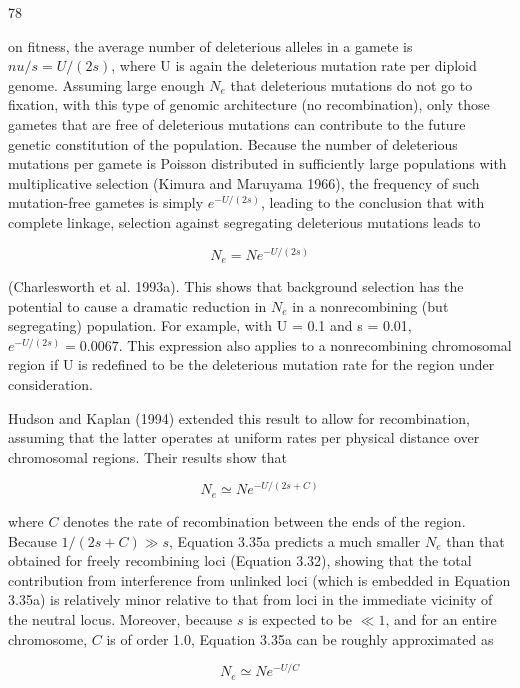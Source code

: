 \documentclass{article}
\begin{document}
78

on fitness, the average number of deleterious alleles in a gamete is  $ nu/s = U/(2s) $, where U is again the deleterious mutation rate per diploid genome. Assuming large enough  $ N_e $ that deleterious mutations do not go to fixation, with this type of genomic architecture (no recombination), only those gametes that are free of deleterious mutations can contribute to the future genetic constitution of the population. Because the number of deleterious mutations per gamete is Poisson distributed in sufficiently large populations with multiplicative selection (Kimura and Maruyama 1966), the frequency of such mutation-free gametes is simply  $ e^{-U/(2s)} $, leading to the conclusion that with complete linkage, selection against segregating deleterious mutations leads to

\begin{equation}
N_{e}=N e^{-U/(2s)}
\tag{3.34}
\label{eq:3_34}
\end{equation}

(Charlesworth et al. 1993a). This shows that background selection has the potential to cause a dramatic reduction in  $ N_e $ in a nonrecombining (but segregating) population. For example, with U = 0.1 and s = 0.01,  $ e^{-U/(2s)} = 0.0067 $. This expression also applies to a nonrecombining chromosomal region if U is redefined to be the deleterious mutation rate for the region under consideration.

Hudson and Kaplan (1994) extended this result to allow for recombination, assuming that the latter operates at uniform rates per physical distance over chromosomal regions. Their results show that

\begin{equation}
N_{e}\simeq N e^{-U/(2s+C)}
\tag{3.35a}
\label{eq:3_35a}
\end{equation}

where $C$ denotes the rate of recombination between the ends of the region. Because $1/(2s + C) \gg s$, Equation 3.35a predicts a much smaller $N_e$ than that obtained for freely recombining loci (Equation 3.32), showing that the total contribution from interference from unlinked loci (which is embedded in Equation 3.35a) is relatively minor relative to that from loci in the immediate vicinity of the neutral locus. Moreover, because $s$ is expected to be $\ll 1$, and for an entire chromosome, $C$ is of order 1.0, Equation 3.35a can be roughly approximated as

\begin{equation}
N_{e}\simeq N e^{-U/C}
\tag{3.35b}
\label{eq:3_35b}
\end{equation}
\end{document}
